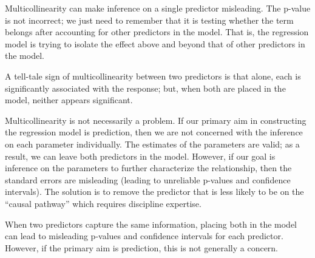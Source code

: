 \documentclass[
  letterpaper,
  DIV=11,
  numbers=noendperiod]{scrreprt}
\theoremstyle{definition}
\theoremstyle{definition}
\theoremstyle{remark}
\begin{document}
Multicollinearity can make inference on a single predictor misleading.
The p-value is not incorrect; we just need to remember that it is
testing whether the term belongs after accounting for other predictors
in the model. That is, the regression model is trying to isolate the
effect above and beyond that of other predictors in the model.

\begin{tcolorbox}[enhanced jigsaw, left=2mm, toprule=.15mm, arc=.35mm, breakable, opacitybacktitle=0.6, opacityback=0, rightrule=.15mm, colbacktitle=quarto-callout-note-color!10!white, coltitle=black, leftrule=.75mm, toptitle=1mm, colframe=quarto-callout-note-color-frame, titlerule=0mm, title=\textcolor{quarto-callout-note-color}{\faInfo}\hspace{0.5em}{Note}, bottomrule=.15mm, colback=white, bottomtitle=1mm]

A tell-tale sign of multicollinearity between two predictors is that
alone, each is significantly associated with the response; but, when
both are placed in the model, neither appears significant.

\end{tcolorbox}

Multicollinearity is not necessarily a problem. If our primary aim in
constructing the regression model is prediction, then we are not
concerned with the inference on each parameter individually. The
estimates of the parameters are valid; as a result, we can leave both
predictors in the model. However, if our goal is inference on the
parameters to further characterize the relationship, then the standard
errors are misleading (leading to unreliable p-values and confidence
intervals). The solution is to remove the predictor that is less likely
to be on the ``causal pathway'' which requires discipline expertise.

\begin{tcolorbox}[enhanced jigsaw, left=2mm, toprule=.15mm, arc=.35mm, breakable, opacitybacktitle=0.6, opacityback=0, rightrule=.15mm, colbacktitle=quarto-callout-tip-color!10!white, coltitle=black, leftrule=.75mm, toptitle=1mm, colframe=quarto-callout-tip-color-frame, titlerule=0mm, title=\textcolor{quarto-callout-tip-color}{\faLightbulb}\hspace{0.5em}{Big Idea}, bottomrule=.15mm, colback=white, bottomtitle=1mm]

When two predictors capture the same information, placing both in the
model can lead to misleading p-values and confidence intervals for each
predictor. However, if the primary aim is prediction, this is not
generally a concern.

\end{tcolorbox}
\end{document}
